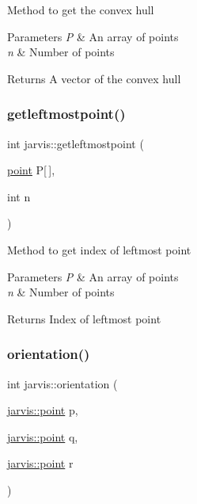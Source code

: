 Method to get the convex hull 
\begin{DoxyParams}{Parameters}
{\em P} & An array of points \\
\hline
{\em n} & Number of points \\
\hline
\end{DoxyParams}
\begin{DoxyReturn}{Returns}
A vector of the convex hull 
\end{DoxyReturn}
\mbox{\label{classjarvis_a0086d1ec638f6cf9d8ab77506222f71a}} 
\subsubsection{\texorpdfstring{getleftmostpoint()}{getleftmostpoint()}}
{\footnotesize\ttfamily int jarvis\+::getleftmostpoint (\begin{DoxyParamCaption}\item[{\hyperlink{structjarvis_1_1point}{point}}]{P\mbox{[}$\,$\mbox{]},  }\item[{int}]{n }\end{DoxyParamCaption})}

Method to get index of leftmost point 
\begin{DoxyParams}{Parameters}
{\em P} & An array of points \\
\hline
{\em n} & Number of points \\
\hline
\end{DoxyParams}
\begin{DoxyReturn}{Returns}
Index of leftmost point 
\end{DoxyReturn}
\mbox{\label{classjarvis_a2f27b457b2c03383d75de6c2e64d3c78}} 
\subsubsection{\texorpdfstring{orientation()}{orientation()}}
{\footnotesize\ttfamily int jarvis\+::orientation (\begin{DoxyParamCaption}\item[{\hyperlink{structjarvis_1_1point}{jarvis\+::point}}]{p,  }\item[{\hyperlink{structjarvis_1_1point}{jarvis\+::point}}]{q,  }\item[{\hyperlink{structjarvis_1_1point}{jarvis\+::point}}]{r }\end{DoxyParamCaption})}

